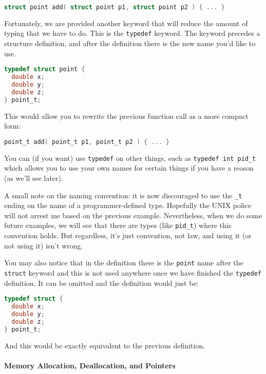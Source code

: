 \begin{lstlisting}[language=C]
struct point add( struct point p1, struct point p2 ) { ... }
\end{lstlisting}

Fortunately, we are provided another keyword that will reduce the amount of typing that we have to do. This is the \texttt{typedef} keyword. The keyword precedes a structure definition, and after the definition there is the new name you'd like to use.

\begin{lstlisting}[language=C]
typedef struct point {
  double x;
  double y;
  double z;
} point_t;
\end{lstlisting}

This would allow you to rewrite the previous function call as a more compact form:

\begin{lstlisting}[language=C]
point_t add( point_t p1, point_t p2 ) { ... }
\end{lstlisting}

You can (if you want) use \texttt{typedef} on other things, such as \texttt{typedef int pid\_t} which allows you to use your own names for certain things if you have a reason (as we'll see later).

A small note on the naming convention: it is now discouraged to use the \texttt{\_t} ending on the name of a programmer-defined type. Hopefully the UNIX police will not arrest me based on the previous example. Nevertheless, when we do some future examples, we will see that there are types (like \texttt{pid\_t}) where this convention holds. But regardless, it's just convention, not law, and using it (or not using it) isn't wrong.

You may also notice that in the definition there is the \texttt{point} name after the \texttt{struct} keyword and this is not used anywhere once we have finished the \texttt{typedef} definition. It can be omitted and the definition would just be:

\begin{lstlisting}[language=C]
typedef struct {
  double x;
  double y;
  double z;
} point_t;
\end{lstlisting}

And this would be exactly equivalent to the previous definition.

\paragraph{Memory Allocation, Deallocation, and Pointers}

